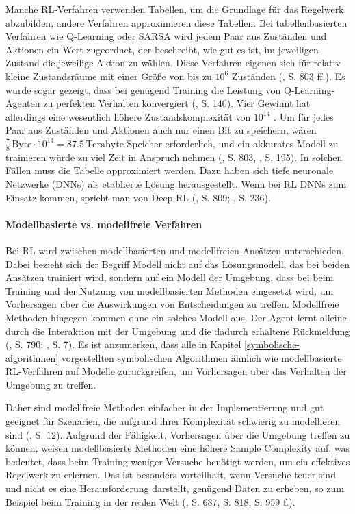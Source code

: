 Manche RL-Verfahren verwenden Tabellen, um die Grundlage für das Regelwerk abzubilden, andere Verfahren approximieren diese Tabellen. Bei tabellenbasierten Verfahren wie Q-Learning oder SARSA wird jedem Paar aus Zuständen und Aktionen ein Wert zugeordnet, der beschreibt, wie gut es ist, im jeweiligen Zustand die jeweilige Aktion zu wählen. Diese Verfahren eigenen sich für relativ kleine Zustandsräume mit einer Größe von bis zu $10^{6}$ Zuständen (\cite{Russell.2020}, S. 803 ff.). Es wurde sogar gezeigt, dass bei genügend Training die Leistung von Q-Learning-Agenten zu perfekten Verhalten konvergiert (\cite{Sutton.2018}, S. 140). Vier Gewinnt hat allerdings eine wesentlich höhere Zustandskomplexität von $10^{14}$ \cite{Allis.1994}. Um für jedes Paar aus Zuständen und Aktionen auch nur einen Bit zu speichern, wären $\frac{7}{8} \, \text{Byte} \cdot 10^{14} = 87.5 \, \text{Terabyte}$ Speicher erforderlich, und ein akkurates Modell zu trainieren würde zu viel Zeit in Anspruch nehmen (\cite{Russell.2020}, S. 803, \cite{Sutton.2018}, S. 195). In solchen Fällen muss die Tabelle approximiert werden. Dazu haben sich tiefe neuronale Netzwerke (DNNs) als etablierte Lösung herausgestellt. Wenn bei RL DNNs zum Einsatz kommen, spricht man von Deep RL (\cite{Russell.2020}, S. 809; \cite{Sutton.2018}, S. 236).

\paragraph{Modellbasierte vs. modellfreie Verfahren}

Bei RL wird zwischen modellbasierten und modellfreien Ansätzen unterschieden. Dabei bezieht sich der Begriff \glqq Modell\grqq{} nicht auf das Lösungsmodell, das bei beiden Ansätzen trainiert wird, sondern auf ein Modell der Umgebung, dass bei beim Training und der Nutzung von modellbasierten Methoden eingesetzt wird, um Vorhersagen über die Auswirkungen von Entscheidungen zu treffen. Modellfreie Methoden hingegen kommen ohne ein solches Modell aus. Der Agent lernt alleine durch die Interaktion mit der Umgebung und die dadurch erhaltene Rückmeldung (\cite{Russell.2020}, S. 790; \cite{Sutton.2018}, S. 7). Es ist anzumerken, dass alle in Kapitel \ref{symbolische-algorithmen} vorgestellten symbolischen Algorithmen ähnlich wie modellbasierte RL-Verfahren auf Modelle zurückgreifen, um Vorhersagen über das Verhalten der Umgebung zu treffen.

Daher sind modellfreie Methoden einfacher in der Implementierung und gut geeignet für Szenarien, die aufgrund ihrer Komplexität schwierig zu modellieren sind (\cite{Sutton.2018}, S. 12). Aufgrund der Fähigkeit, Vorhersagen über die Umgebung treffen zu können, weisen modellbasierte Methoden eine höhere Sample Complexity auf, was bedeutet, dass beim Training weniger Versuche benötigt werden, um ein effektives Regelwerk zu erlernen. Das ist besonders vorteilhaft, wenn Versuche teuer sind und nicht es eine Herausforderung darstellt, genügend Daten zu erheben, so zum Beispiel beim Training in der realen Welt (\cite{Russell.2020}, S. 687, S. 818, S. 959 f.).

